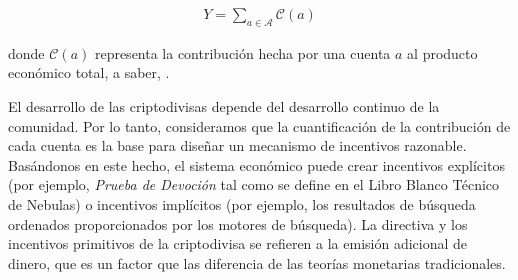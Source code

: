 \begin{align}
Y=\sum_{a\in \mathcal{A}} \mathcal{C}(a)
\end{align}

\noindent donde $\mathcal{C}(a)$ representa la contribución hecha por una cuenta $a$ al producto económico total, a saber, \nrcore.

El desarrollo de las criptodivisas depende del desarrollo continuo de la comunidad. Por lo tanto, consideramos que la cuantificación de la contribución de cada cuenta es la base para diseñar un mecanismo de incentivos razonable. Basándonos en este hecho, el sistema económico puede crear incentivos explícitos (por ejemplo, \textit{Prueba de Devoción} tal como se define en el Libro Blanco Técnico de Nebulas) o incentivos implícitos (por ejemplo, los resultados de búsqueda ordenados proporcionados por los motores de búsqueda). La directiva y los incentivos primitivos de la criptodivisa se refieren a la emisión adicional de dinero, que es un factor que las diferencia de las teorías monetarias tradicionales.